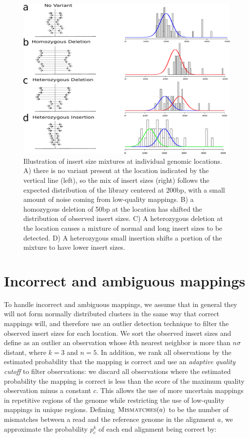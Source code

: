 \begin{figure}
\centering
\includegraphics[width=.9\textwidth]{figures/insert_size_mixtures.pdf}
\caption{Illustration of insert size mixtures at individual genomic locations. A) there is no variant present at the location indicated by the vertical line (left), so the mix of insert sizes (right) follows the expected distribution of the library centered at 200bp, with a small amount of noise coming from low-quality mappings. B) a homozygous deletion of 50bp at the location has shifted the distribution of observed insert sizes. C) A heterozygous deletion at the location causes a mixture of normal and long insert sizes to be detected. D) A heterozygous small insertion shifts a portion of the mixture to have lower insert sizes.}
\label{insert_size_mixes}
\end{figure}


\section{Incorrect and ambiguous mappings}

To handle incorrect and ambiguous mappings, we assume that in general they will not form normally distributed clusters in the same way that correct mappings will, and therefore use an outlier detection technique to filter the observed insert sizes for each location. We sort the observed insert sizes and define as an outlier an observation whose $k$th nearest neighbor is more than $n\sigma$ distant, where $k = 3$ and $n = 5$. In addition, we rank all observations by the estimated probability that the mapping is correct and use an \emph{adaptive quality cutoff} to filter observations: we discard all observations where the estimated probability the mapping is correct is less than the score of the maximum quality observation minus a constant $c$. This allows the use of more uncertain mappings in repetitive regions of the genome while restricting the use of low-quality mappings in unique regions. Defining $\textsc{Mismatches}(a)$ to be the number of mismatches between a read and the reference genome in the alignment $a$, we approximate the probability $p^{k}_c$ of each end alignment being correct by:

